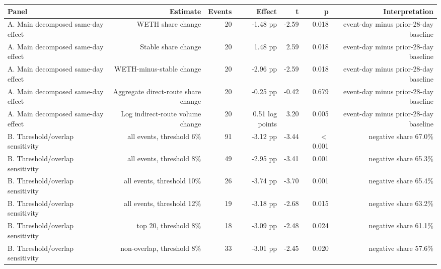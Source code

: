 \begin{tabular}{lrrrrrr}
\toprule
Panel & Estimate & Events & Effect & t & p & Interpretation \\
\midrule
A. Main decomposed same-day effect & WETH share change & 20 & -1.48 pp & -2.59 & 0.018 & event-day minus prior-28-day baseline \\
A. Main decomposed same-day effect & Stable share change & 20 & 1.48 pp & 2.59 & 0.018 & event-day minus prior-28-day baseline \\
A. Main decomposed same-day effect & WETH-minus-stable change & 20 & -2.96 pp & -2.59 & 0.018 & event-day minus prior-28-day baseline \\
A. Main decomposed same-day effect & Aggregate direct-route share change & 20 & -0.25 pp & -0.42 & 0.679 & event-day minus prior-28-day baseline \\
A. Main decomposed same-day effect & Log indirect-route volume change & 20 & 0.51 log points & 3.20 & 0.005 & event-day minus prior-28-day baseline \\
B. Threshold/overlap sensitivity & all events, threshold 6\% & 91 & -3.12 pp & -3.44 & \ensuremath{<}0.001 & negative share 67.0\% \\
B. Threshold/overlap sensitivity & all events, threshold 8\% & 49 & -2.95 pp & -3.41 & 0.001 & negative share 65.3\% \\
B. Threshold/overlap sensitivity & all events, threshold 10\% & 26 & -3.74 pp & -3.70 & 0.001 & negative share 65.4\% \\
B. Threshold/overlap sensitivity & all events, threshold 12\% & 19 & -3.18 pp & -2.68 & 0.015 & negative share 63.2\% \\
B. Threshold/overlap sensitivity & top 20, threshold 8\% & 18 & -3.09 pp & -2.48 & 0.024 & negative share 61.1\% \\
B. Threshold/overlap sensitivity & non-overlap, threshold 8\% & 33 & -3.01 pp & -2.45 & 0.020 & negative share 57.6\% \\
\bottomrule
\end{tabular}
